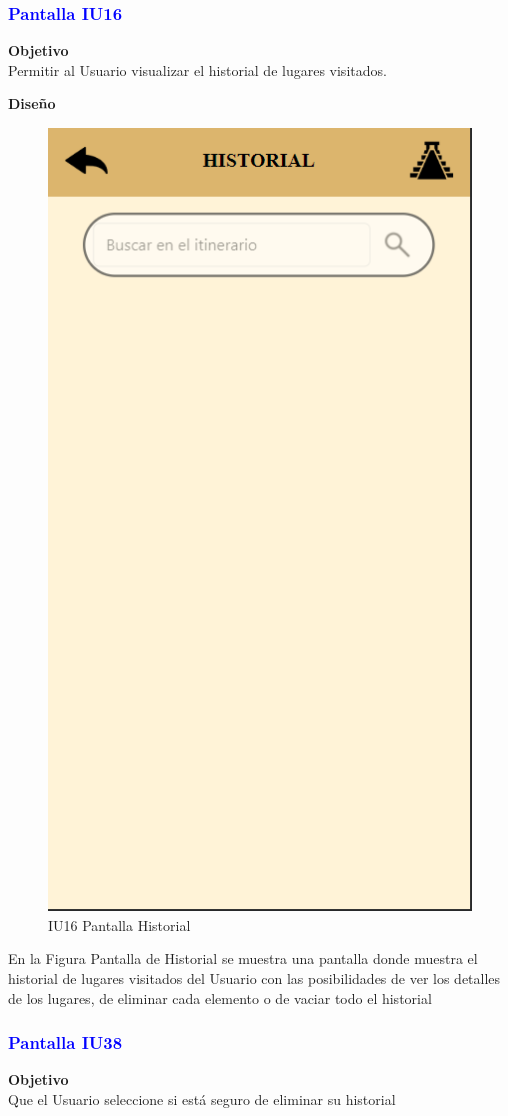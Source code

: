 \vspace{15pt}

\subsubsection{\textcolor{blue}{Pantalla IU16}}

\textbf{Objetivo} \\
Permitir al Usuario visualizar el historial de lugares visitados.
\vspace{15pt}

\textbf{Diseño}

    \begin{figure}[h]
        
            \centering
            \includegraphics[width=.4\linewidth]{entregable final/pantallasSistema/IU16 Pantalla Historial.png}
    \caption{IU16 Pantalla Historial}
    
    \end{figure}

En la Figura Pantalla de Historial se muestra una pantalla donde muestra el historial de lugares visitados del Usuario con las posibilidades de ver los detalles de los lugares, de eliminar cada elemento o de vaciar todo el historial

\subsubsection{\textcolor{blue}{Pantalla IU38}}

\textbf{Objetivo} \\
Que el Usuario seleccione si está seguro de eliminar su historial
\vspace{15pt}

